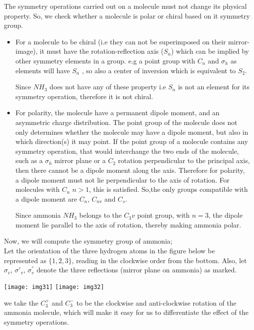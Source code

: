\documentclass[a4paper, 12pt, openany]{report}
\begin{document}
   The symmetry operations carried out on a molecule must not change its physical property. So, we check whether a molecule is polar or chiral based on it symmetry group.
    \begin{itemize}
    	\item For a molecule to be chiral (i.e they can not be superimposed on their \linebreak mirror-image), it must have the rotation-reflection axis ($S_n$) which can be implied by other symmetry elements in a group. e.g a point group with $C_n$ and $\sigma_h$ as elements will have $S_n$ , so also a center of inversion which is equivalent to $S_2$.
    	
    	Since $NH_3$ does not have any of these property i.e $S_n$ is not an element for its symmetry operation, therefore it is not chiral.
    	
    	\item For polarity, the molecule have a permanent dipole moment, and an \linebreak asymmetric charge distribution. The point group of the molecule does not only determines whether the molecule may have a dipole moment, but also in which direction(s) it may point. If the point group of a molecule contains any symmetry operation, that would interchange the two ends of	the molecule, such as a $\sigma_h$ mirror plane or a $C_2$ \break rotation perpendicular to the principal axis, then there cannot be a
    	\break dipole moment along the axis. Therefore for polarity, a dipole moment 
    	must not lie perpendicular to the axis of rotation. For molecules with  $C_n$  $n>1$, this is satisfied. So,the only groups compatible with a dipole moment are $C_n$, $C_{nv}$ and $C_s$.
    	
    	Since ammonia $NH_3$ belongs to the $C_3v$ point group, with $n=3$, the dipole moment lie parallel to the axis of rotation, thereby making ammonia polar.
    \end{itemize}
Now, we will compute the symmetry group of ammonia;\\
Let the orientation of the three hydrogen atoms in the figure below be \break represented as $\{1,2,3\}$, reading in the clockwise order from the bottom. Also, let  $\sigma_v$, $\sigma'_v$, $\sigma_v^{''}$ denote the three reflections (mirror plane on ammonia) as marked.
	\begin{center} \texttt{[image: img31]} 
 \texttt{[image: img32]}  \end{center} 
 we take the $C_3^+$ and $C_3^-$ to be the clockwise and anti-clockwise rotation of the ammonia molecule, which will make it easy for us to differentiate the effect of the symmetry operations.
 
\end{document}

